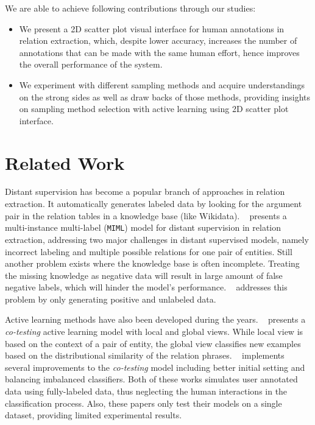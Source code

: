 \documentclass[11pt,a4paper]{article}
\begin{document}
  We are able to achieve following contributions through our studies:

  \begin{itemize}
    \item We present a 2D scatter plot visual interface for human annotations in relation extraction, which, despite lower accuracy, increases the number of annotations that can be made with the same human effort, hence improves the overall performance of the system.
    \item We experiment with different sampling methods and acquire understandings on the strong sides as well as draw backs of those methods, providing insights on sampling method selection with active learning using 2D scatter plot interface.
  \end{itemize}

  \section{Related Work}
    Distant supervision has become a popular branch of approaches in relation extraction. It automatically generates labeled data by looking for the argument pair in the relation tables in a knowledge base (like Wikidata). ~\citet{surdeanu2012multi} presents a multi-instance multi-label (\texttt{MIML}) model for distant supervision in relation extraction, addressing two major challenges in distant supervised models, namely incorrect labeling and multiple possible relations for one pair of entities. Still another problem exists where the knowledge base is often incomplete. Treating the missing knowledge as negative data will result in large amount of false negative labels, which will hinder the model's performance. ~\citet{min2013distant} addresses this problem by only generating positive and unlabeled data. 
    
    Active learning methods have also been developed during the years.
~\citet{sun2012active} presents a \emph{co-testing} active learning model with local and global views. While local view is based on the context of a pair of entity, the global view classifies new examples based on the distributional similarity of the relation phrases. ~\citet{fu2013efficient} implements several improvements to the \emph{co-testing} model including better initial setting and balancing imbalanced classifiers. Both of these works simulates user annotated data using fully-labeled data, thus neglecting the human interactions in the classification process. Also, these papers only test their models on a single dataset, providing limited experimental results.
\end{document}
